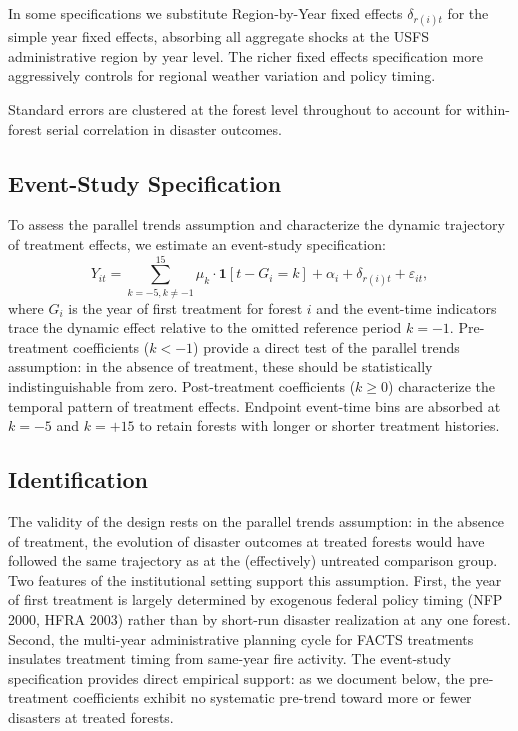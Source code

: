 \documentclass[12pt, letterpaper]{article}
\begin{document}
In some specifications we substitute Region-by-Year fixed effects $\delta_{r(i)t}$ for the simple year fixed effects, absorbing all aggregate shocks at the USFS administrative region by year level. The richer fixed effects specification more aggressively controls for regional weather variation and policy timing.

Standard errors are clustered at the forest level throughout to account for within-forest serial correlation in disaster outcomes.

\subsection{Event-Study Specification}

To assess the parallel trends assumption and characterize the dynamic trajectory of treatment effects, we estimate an event-study specification:
\begin{equation}
Y_{it} = \sum_{k = -5, k \neq -1}^{15} \mu_k \cdot \mathbf{1}[t - G_i = k] + \alpha_i + \delta_{r(i)t} + \varepsilon_{it},
\label{eq:eventstudy}
\end{equation}
where $G_i$ is the year of first treatment for forest $i$ and the event-time indicators trace the dynamic effect relative to the omitted reference period $k = -1$. Pre-treatment coefficients ($k < -1$) provide a direct test of the parallel trends assumption: in the absence of treatment, these should be statistically indistinguishable from zero. Post-treatment coefficients ($k \geq 0$) characterize the temporal pattern of treatment effects. Endpoint event-time bins are absorbed at $k = -5$ and $k = +15$ to retain forests with longer or shorter treatment histories.

\subsection{Identification}

The validity of the design rests on the parallel trends assumption: in the absence of treatment, the evolution of disaster outcomes at treated forests would have followed the same trajectory as at the (effectively) untreated comparison group. Two features of the institutional setting support this assumption. First, the year of first treatment is largely determined by exogenous federal policy timing (NFP 2000, HFRA 2003) rather than by short-run disaster realization at any one forest. Second, the multi-year administrative planning cycle for FACTS treatments insulates treatment timing from same-year fire activity. The event-study specification provides direct empirical support: as we document below, the pre-treatment coefficients exhibit no systematic pre-trend toward more or fewer disasters at treated forests.
\end{document}
